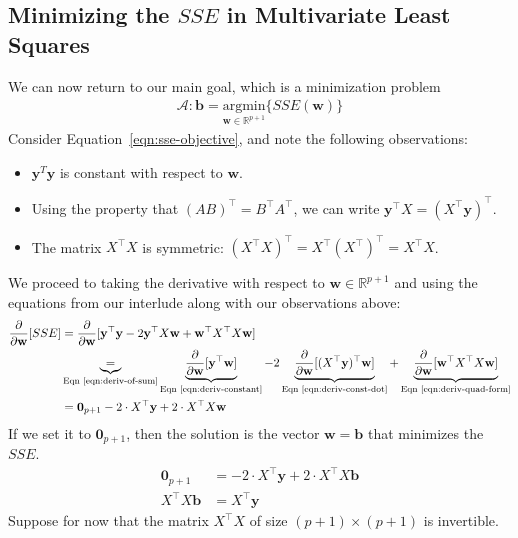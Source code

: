 \documentclass[12pt, a4paper]{article}
\theoremstyle{definition}
\begin{document}
	\subsection*{Minimizing the $SSE$ in Multivariate Least Squares}
	We can now return to our main goal, which is a minimization problem
	\begin{align*}
		\mathcal{A}:\mathbf{b} = \underset{\mathbf{w}\in\mathbb{R}^{p+1}}{\text{argmin}}\{SSE(\mathbf{w})\}
	\end{align*}
	Consider Equation~\ref{eqn:sse-objective}, and note the following observations:
	\begin{itemize}
		\item $\mathbf{y}^T\mathbf{y}$ is constant with respect to $\mathbf{w}$.
		\item Using the property that $(AB)^\top = B^\top A^\top$, we can write
		$\mathbf{y}^\top X = (X^\top \mathbf{y})^\top$.
		\item The matrix $X^\top X$ is symmetric: $(X^\top X)^\top = X^\top (X^\top)^\top=X^\top X$.
	\end{itemize}
	We proceed to taking the derivative with respect to
	$\mathbf{w}\in\mathbb{R}^{p+1}$ and using the equations from our interlude along with our
	observations above:
	\begin{align*}
		\frac{\partial}{\partial \mathbf{w}}[SSE]
		&= \frac{\partial}{\partial \mathbf{w}}[
		\mathbf{y}^\top \mathbf{y} - 2\mathbf{y}^\top X \mathbf{w} + \mathbf{w}^\top X^\top X \mathbf{w}
		]\\
		&\underbrace{=}_{\text{Eqn~\ref{eqn:deriv-of-sum}}}\underbrace{\frac{\partial}{\partial \mathbf{w}}[\mathbf{y}^\top \mathbf{w}]}_{\text{Eqn~\ref{eqn:deriv-constant}}}
		-2\underbrace{\frac{\partial}{\partial \mathbf{w}}[(X^\top \mathbf{y})^\top\mathbf{w}]}_{\text{Eqn~\ref{eqn:deriv-const-dot}}}
		+\underbrace{\frac{\partial}{\partial \mathbf{w}}[\mathbf{w}^\top X^\top X\mathbf{w}]}_{\text{Eqn~\ref{eqn:deriv-quad-form}}}\\
		&= \mathbf{0}_{p+1} - 2\cdot X^\top \mathbf{y} + 2\cdot X^\top X\mathbf{w}
	\end{align*}
	If we set it to $\mathbf{0}_{p+1}$, then the solution is the vector $\mathbf{w}=\mathbf{b}$
	that minimizes the $SSE$.
	\begin{align*}
		\mathbf{0}_{p+1} &= - 2\cdot X^\top \mathbf{y} + 2\cdot X^\top X\mathbf{b}\\
		X^\top X\mathbf{b} &= X^\top \mathbf{y}
	\end{align*}
	Suppose for now that the matrix $X^\top X$ of size $(p+1)\times(p+1)$ is invertible.
\end{document}

